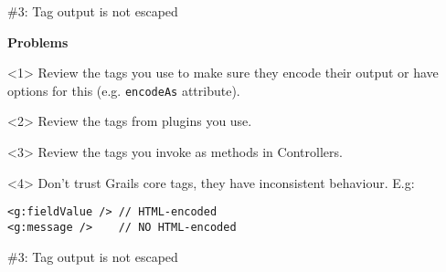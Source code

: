 {%

\begin{frame}

  \vspace{.5cm}

  \begin{center}
    \Huge\color{red} \#3: Tag output is not escaped
  \end{center}

  \vspace{1cm}

    \Large
    \textbf{Problems} \\[1em]

    \begin{onlyenv}<1>
      Review the tags you use to make sure they encode their output
      or have options for this (e.g. \verb|encodeAs| attribute).
    \end{onlyenv}

    \begin{onlyenv}<2>
      Review the tags from plugins you use.
    \end{onlyenv}

    \begin{onlyenv}<3>
      Review the tags you invoke as methods in Controllers.
    \end{onlyenv}

    \begin{onlyenv}<4>
      Don't trust Grails core tags, they have inconsistent behaviour. E.g:
      \begin{center}
        \begin{minipage}{.9\textwidth}
          \begin{verbatim}
<g:fieldValue /> // HTML-encoded
<g:message />    // NO HTML-encoded
          \end{verbatim}
        \end{minipage}
      \end{center}
    \end{onlyenv}

    \vfill

\end{frame}


\begin{frame}

  \vspace{.5cm}

  \begin{center}
    \Huge\color{red} \#3: Tag output is not escaped
  \end{center}


\end{frame}}
